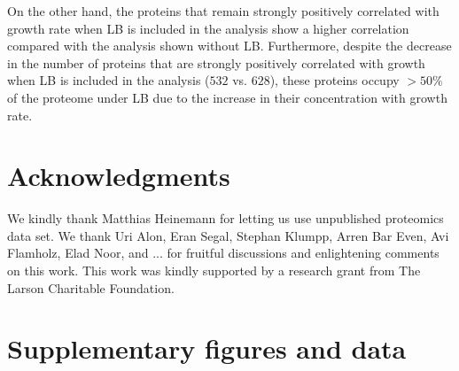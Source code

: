 \documentclass[a4paper]{article}
\newcommand{\beginsupplement}{%
        \setcounter{table}{0}
        \renewcommand{\thetable}{S\arabic{table}}%
        \setcounter{figure}{0}
        \renewcommand{\thefigure}{S\arabic{figure}}%
    }
\newcommand{\hGlobal}{$628$}
\newcommand{\hGlobalLB}{$532$}
\begin{document}
On the other hand, the proteins that remain strongly positively correlated with growth rate when LB is included in the analysis show a higher correlation compared with the analysis shown without LB.
Furthermore, despite the decrease in the number of proteins that are strongly positively correlated with growth when LB is included in the analysis (\hGlobalLB{} vs. \hGlobal{}), these proteins occupy $>50\%$ of the proteome under LB due to the increase in their concentration with growth rate.

\section{Acknowledgments}
We kindly thank Matthias Heinemann for letting us use unpublished proteomics data set.
We thank Uri Alon,  Eran Segal, Stephan Klumpp, Arren Bar Even, Avi Flamholz, Elad Noor, and ... for fruitful discussions and enlightening comments on this work.
This work was kindly supported by a research grant from The Larson Charitable Foundation.

\section{Supplementary figures and data}
\beginsupplement
\end{document}

